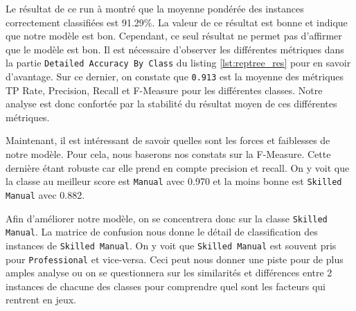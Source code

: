 Le résultat de ce run à montré que la moyenne pondérée des instances correctement classifiées est 91.29\%. La valeur de ce résultat est bonne et indique que notre modèle est bon. Cependant, ce seul résultat ne permet pas d'affirmer que le modèle est bon. Il est nécessaire d'observer les différentes métriques dans la partie \texttt{Detailed Accuracy By Class} du listing \autoref{lst:reptree_res} pour en savoir d'avantage. Sur ce dernier, on constate que \texttt{0.913} est la moyenne des métriques TP Rate, Precision, Recall et F-Measure pour les différentes classes. Notre analyse est donc confortée par la stabilité du résultat moyen de ces différentes métriques.

Maintenant, il est intéressant de savoir quelles sont les forces et faiblesses de notre modèle. Pour cela, nous baserons nos constats sur la F-Measure. Cette dernière étant robuste car elle prend en compte precision et recall. On y voit que la classe au meilleur score est \texttt{Manual} avec 0.970 et la moins bonne est \texttt{Skilled Manual} avec 0.882.

Afin d'améliorer notre modèle, on se concentrera donc sur la classe \texttt{Skilled Manual}. La matrice de confusion nous donne le détail de classification des instances de \texttt{Skilled Manual}. On y voit que \texttt{Skilled Manual} est souvent pris pour \texttt{Professional} et vice-versa. Ceci peut nous donner une piste pour de plus amples analyse ou on se questionnera sur les similarités et différences entre 2 instances de chacune des classes pour comprendre quel sont les facteurs qui rentrent en jeux.

